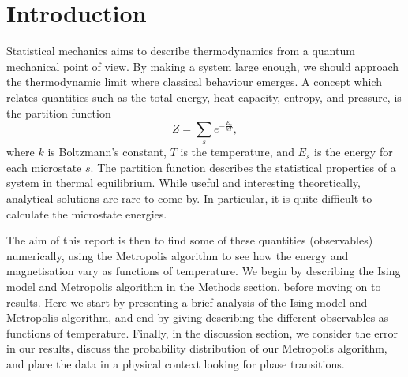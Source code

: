 \section{Introduction}
\label{sec:introduction}

Statistical mechanics aims to describe thermodynamics from a quantum mechanical point of view.
By making a system large enough, we should approach the thermodynamic limit where classical behaviour emerges. A concept which relates quantities such as the total energy, heat capacity, entropy, and pressure, is the partition function
  \begin{equation}
    \label{eq:partition}
    Z = \sum_s e^{-\frac{E_s}{kT}},
  \end{equation}
where $k$ is Boltzmann's constant, $T$ is the temperature, and $E_s$ is the energy for each microstate $s$.
The partition function describes the statistical properties of a system in thermal equilibrium.
While useful and interesting theoretically, analytical solutions are rare to come by. In particular,
it is quite difficult to calculate the microstate energies.

The aim of this report is then to find some of these quantities (observables) numerically, using
the Metropolis algorithm to see how the energy and magnetisation vary as functions of temperature.
We begin by describing the Ising model and Metropolis algorithm in the Methods section, before moving on to results. Here we start by presenting a brief analysis of the Ising model and Metropolis algorithm, and end by giving describing the different observables as functions of temperature. Finally, in the discussion section, we consider the error in our results, discuss the probability distribution of our Metropolis algorithm, and place the data in a physical context looking for phase transitions.
